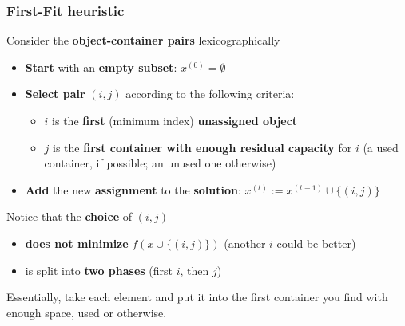 \subsubsection{First-Fit heuristic}
Consider the \textbf{object-container pairs} lexicographically
\begin{itemize}
	\item \textbf{Start} with an \textbf{empty subset}: $x^{(0)} = \emptyset$
	\item \textbf{Select pair} $(i, j)$ according to the following criteria:
	\begin{itemize}
		\item $i$ is the \textbf{first} (minimum index) \textbf{unassigned object}
		\item $j$ is the \textbf{first container with enough residual capacity} for $i$ (a used container, if possible; an unused one otherwise)
	\end{itemize}
	\item \textbf{Add} the new \textbf{assignment} to the \textbf{solution}: $x^{(t)} := x^{(t−1)} \cup \{(i, j)\}$
\end{itemize}

Notice that the \textbf{choice} of $(i, j)$
\begin{itemize}
	\item \textbf{does not minimize} $f (x \cup \{(i, j)\})$ (another $i$ could be better)
	\item is split into \textbf{two phases} (first $i$, then $j$)
\end{itemize}

Essentially, take each element and put it into the first container you find with enough space, used or otherwise.\\

\newpage

